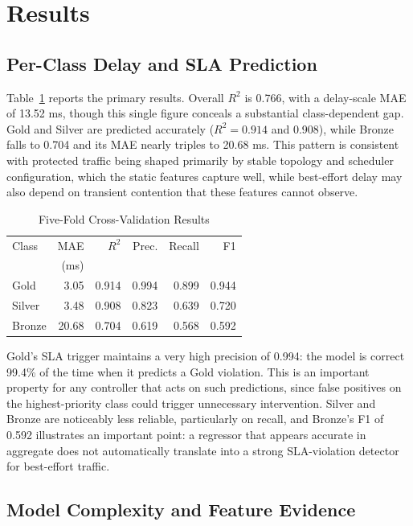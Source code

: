 \documentclass[conference]{IEEEtran}
\begin{document}
\section{Results}

\subsection{Per-Class Delay and SLA Prediction}

Table~\ref{tab:main} reports the primary results. Overall $R^2$ is 0.766, with a delay-scale MAE of 13.52 ms, though this single figure conceals a substantial class-dependent gap. Gold and Silver are predicted accurately ($R^2=0.914$ and 0.908), while Bronze falls to 0.704 and its MAE nearly triples to 20.68 ms. This pattern is consistent with protected traffic being shaped primarily by stable topology and scheduler configuration, which the static features capture well, while best-effort delay may also depend on transient contention that these features cannot observe.

\begin{table}[t]
\caption{Five-Fold Cross-Validation Results}
\label{tab:main}
\centering
\setlength{\tabcolsep}{3.5pt}
\begin{tabular}{lrrrrr}
\toprule
Class & MAE & $R^2$ & Prec. & Recall & F1 \\
 & (ms) & & & & \\
\midrule
Gold   & 3.05  & 0.914 & 0.994 & 0.899 & 0.944 \\
Silver & 3.48  & 0.908 & 0.823 & 0.639 & 0.720 \\
Bronze & 20.68 & 0.704 & 0.619 & 0.568 & 0.592 \\
\bottomrule
\end{tabular}
\end{table}

Gold's SLA trigger maintains a very high precision of 0.994: the model is correct 99.4\% of the time when it predicts a Gold violation. This is an important property for any controller that acts on such predictions, since false positives on the highest-priority class could trigger unnecessary intervention. Silver and Bronze are noticeably less reliable, particularly on recall, and Bronze's F1 of 0.592 illustrates an important point: a regressor that appears accurate in aggregate does not automatically translate into a strong SLA-violation detector for best-effort traffic.

\subsection{Model Complexity and Feature Evidence}
\end{document}
